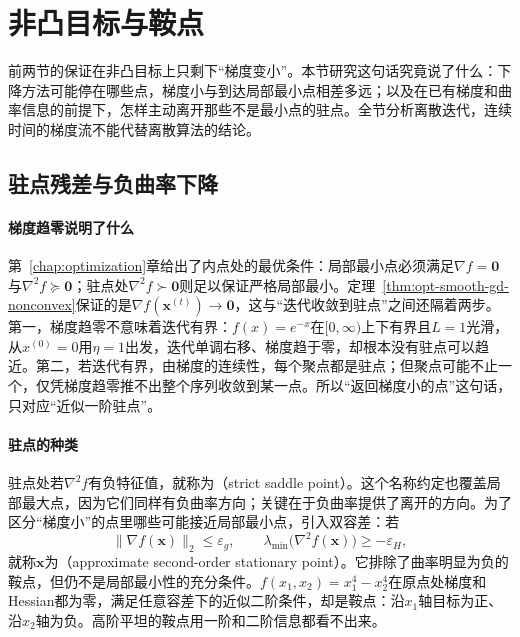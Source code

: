\section{非凸目标与鞍点}
\label{sec:opt-smooth-nonconvex}

前两节的保证在非凸目标上只剩下“梯度变小”。本节研究这句话究竟说了什么：下降方法可能停在哪些点，梯度小与到达局部最小点相差多远；以及在已有梯度和曲率信息的前提下，怎样主动离开那些不是最小点的驻点。全节分析离散迭代，连续时间的梯度流不能代替离散算法的结论。

\subsection{驻点残差与负曲率下降}
\label{sec:opt-smooth-negative-curvature}

\paragraph{梯度趋零说明了什么}
第~\ref{chap:optimization}章给出了内点处的最优条件：局部最小点必须满足$\nabla f=\bm0$与$\nabla^2f\succeq\bm0$；驻点处$\nabla^2f\succ\bm0$则足以保证严格局部最小。定理~\ref{thm:opt-smooth-gd-nonconvex}保证的是$\nabla f(\bm x^{(t)})\to\bm0$，这与“迭代收敛到驻点”之间还隔着两步。第一，梯度趋零不意味着迭代有界：$f(x)=e^{-x}$在$[0,\infty)$上下有界且$L=1$光滑，从$x^{(0)}=0$用$\eta=1$出发，迭代单调右移、梯度趋于零，却根本没有驻点可以趋近。第二，若迭代有界，由梯度的连续性，每个聚点都是驻点；但聚点可能不止一个，仅凭梯度趋零推不出整个序列收敛到某一点。所以“返回梯度小的点”这句话，只对应“近似一阶驻点”。

\paragraph{驻点的种类}
驻点处若$\nabla^2f$有负特征值，就称为（strict saddle point）。这个名称约定也覆盖局部最大点，因为它们同样有负曲率方向；关键在于负曲率提供了离开的方向。为了区分“梯度小”的点里哪些可能接近局部最小点，引入双容差：若
\[
  \lVert\nabla f(\bm x)\rVert_2\leq\varepsilon_g,\qquad\lambda_{\min}\bigl(\nabla^2f(\bm x)\bigr)\geq-\varepsilon_H,
\]
就称$\bm x$为（approximate second-order stationary point）。它排除了曲率明显为负的鞍点，但仍不是局部最小性的充分条件。$f(x_1,x_2)=x_1^4-x_2^4$在原点处梯度和Hessian都为零，满足任意容差下的近似二阶条件，却是鞍点：沿$x_1$轴目标为正、沿$x_2$轴为负。高阶平坦的鞍点用一阶和二阶信息都看不出来。

